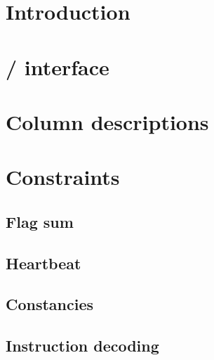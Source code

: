 


\section{Introduction}                                      \label{mmu: intro}                                                 

\section{\hubMod{} / \mmuMod{} interface}                   \label{mmu: hub / mmu interface}                                   

\section{Column descriptions}                               \label{mmu: columns}                                               

\section{Constraints}                                       \label{mmu: constraints}           
\subsection{Flag sum}                                       \label{mmu: constraints: flag sum}                                 
\subsection{Heartbeat}                                      \label{mmu: constraints: heartbeat}                                
\subsection{Constancies}                                    \label{mmu: constraints: constancies}                              
\subsection{Instruction decoding}                           \label{mmu: constraints: decoding}                                 

